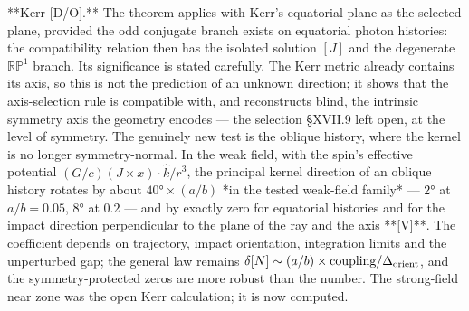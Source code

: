 **Kerr [D/O].** The theorem applies with Kerr's equatorial plane as the selected plane, provided the odd conjugate branch exists on equatorial photon histories: the compatibility relation then has the isolated solution $[J]$ and the degenerate $\mathbb{RP}^1$ branch. Its significance is stated carefully. The Kerr metric already contains its axis, so this is not the prediction of an unknown direction; it shows that the axis-selection rule is compatible with, and reconstructs blind, the intrinsic symmetry axis the geometry encodes — the selection §XVII.9 left open, at the level of symmetry. The genuinely new test is the oblique history, where the kernel is no longer symmetry-normal. In the weak field, with the spin's effective potential $(G/c)(J\times x)\cdot\hat k/r^3$, the principal kernel direction of an oblique history rotates by about $40°\times(a/b)$ *in the tested weak-field family* — $2°$ at $a/b = 0.05$, $8°$ at $0.2$ — and by exactly zero for equatorial histories and for the impact direction perpendicular to the plane of the ray and the axis **[V]**. The coefficient depends on trajectory, impact orientation, integration limits and the unperturbed gap; the general law remains $\delta[N]\sim(a/b)\times\text{coupling}/\Delta_{\rm orient}$, and the symmetry-protected zeros are more robust than the number. The strong-field near zone was the open Kerr calculation; it is now computed.

